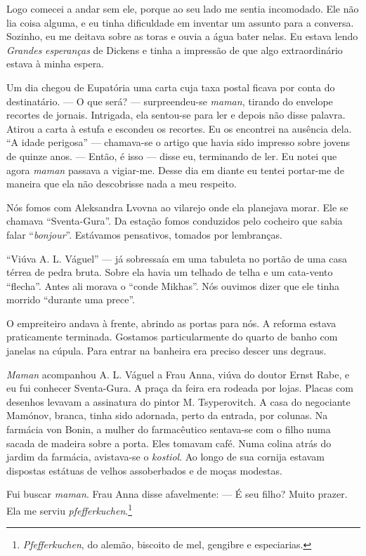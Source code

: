 Logo comecei a andar sem ele, porque ao seu lado me sentia incomodado.
Ele não lia coisa alguma, e eu tinha dificuldade em inventar um assunto
para a conversa. Sozinho, eu me deitava sobre as toras e ouvia a água
bater nelas. Eu estava lendo \emph{Grandes} \emph{esperanças} de Dickens
e tinha a impressão de que algo extraordinário estava à minha espera.

Um dia chegou de Eupatória uma carta cuja taxa postal ficava por conta
do destinatário. --- O que será? --- surpreendeu-se \emph{maman},
tirando do envelope recortes de jornais. Intrigada, ela sentou-se para
ler e depois não disse palavra. Atirou a carta à estufa e escondeu os
recortes. Eu os encontrei na ausência dela. ``A idade perigosa'' ---
chamava-se o artigo que havia sido impresso sobre jovens de quinze anos.
--- Então, é isso --- disse eu, terminando de ler. Eu notei que agora
\emph{maman} passava a vigiar-me. Desse dia em diante eu tentei
portar-me de maneira que ela não descobrisse nada a meu respeito.

Nós fomos com Aleksandra Lvovna ao vilarejo onde ela planejava morar.
Ele se chamava ``Sventa-Gura''. Da estação fomos conduzidos pelo
cocheiro que sabia falar ``\emph{bonjour}''. Estávamos pensativos,
tomados por lembranças.

``Viúva A. L. Váguel'' --- já sobressaía em uma tabuleta no portão de
uma casa térrea de pedra bruta. Sobre ela havia um telhado de telha e um
cata-vento ``flecha''. Antes ali morava o ``conde Mikhas''. Nós ouvimos
dizer que ele tinha morrido ``durante uma prece''.

O empreiteiro andava à frente, abrindo as portas para nós. A reforma
estava praticamente terminada. Gostamos particularmente do quarto de
banho com janelas na cúpula. Para entrar na banheira era preciso descer
uns degraus.

\emph{Maman} acompanhou A. L. Váguel a Frau Anna, viúva do doutor Ernst
Rabe, e eu fui conhecer Sventa-Gura. A praça da feira era rodeada por
lojas. Placas com desenhos levavam a assinatura do pintor M.
Tsyperovitch. A casa do negociante Mamónov, branca, tinha sido adornada,
perto da entrada, por colunas. Na farmácia von Bonin, a mulher do
farmacêutico sentava-se com o filho numa sacada de madeira sobre a
porta. Eles tomavam café. Numa colina atrás do jardim da farmácia,
avistava-se o \emph{kostiol}. Ao longo de sua cornija estavam dispostas
estátuas de velhos assoberbados e de moças modestas.

Fui buscar \emph{maman}. Frau Anna disse afavelmente: --- É seu filho?
Muito prazer. Ela me serviu \emph{pfefferkuchen}.\footnote{\emph{Pfefferkuchen},
  do alemão, biscoito de mel, gengibre e especiarias.}

